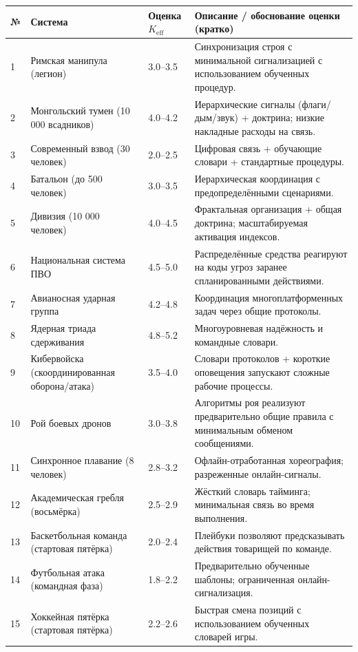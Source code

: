\documentclass[11pt,a4paper]{article}
\begin{document}
	\begin{longtable}{|p{0.8cm}|p{6.2cm}|p{3.0cm}|p{5.7cm}|}
		\hline
		\textbf{№} & \textbf{Система} & \textbf{Оценка $K_{\mathrm{eff}}$} & \textbf{Описание / обоснование оценки (кратко)} \\
		\hline
		\endhead
		1 & Римская манипула (легион) & 3.0--3.5 & Синхронизация строя с минимальной сигнализацией с использованием обученных процедур. \\
		2 & Монгольский тумен (10 000 всадников) & 4.0--4.2 & Иерархические сигналы (флаги/дым/звук) + доктрина; низкие накладные расходы на связь. \\
		3 & Современный взвод (30 человек) & 2.0--2.5 & Цифровая связь + обучающие словари + стандартные процедуры. \\
		4 & Батальон (до 500 человек) & 3.0--3.5 & Иерархическая координация с предопределёнными сценариями. \\
		5 & Дивизия (10 000 человек) & 4.0--4.5 & Фрактальная организация + общая доктрина; масштабируемая активация индексов. \\
		6 & Национальная система ПВО & 4.5--5.0 & Распределённые средства реагируют на коды угроз заранее спланированными действиями. \\
		7 & Авианосная ударная группа & 4.2--4.8 & Координация многоплатформенных задач через общие протоколы. \\
		8 & Ядерная триада сдерживания & 4.8--5.2 & Многоуровневая надёжность и командные словари. \\
		9 & Кибервойска (скоординированная оборона/атака) & 3.5--4.0 & Словари протоколов + короткие оповещения запускают сложные рабочие процессы. \\
		10 & Рой боевых дронов & 3.0--3.8 & Алгоритмы роя реализуют предварительно общие правила с минимальным обменом сообщениями. \\
		11 & Синхронное плавание (8 человек) & 2.8--3.2 & Офлайн-отработанная хореография; разреженные онлайн-сигналы. \\
		12 & Академическая гребля (восьмёрка) & 2.5--2.9 & Жёсткий словарь тайминга; минимальная связь во время выполнения. \\
		13 & Баскетбольная команда (стартовая пятёрка) & 2.0--2.4 & Плейбуки позволяют предсказывать действия товарищей по команде. \\
		14 & Футбольная атака (командная фаза) & 1.8--2.2 & Предварительно обученные шаблоны; ограниченная онлайн-сигнализация. \\
		15 & Хоккейная пятёрка (стартовая пятёрка) & 2.2--2.6 & Быстрая смена позиций с использованием обученных словарей игры. \\

\end{longtable}
\end{document}
